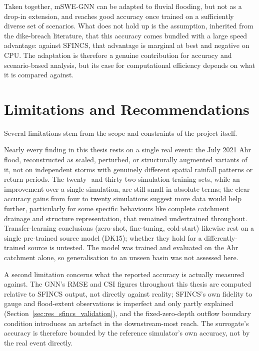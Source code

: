 \documentclass[12pt,a4paper]{report}
\begin{document}
{Taken together, mSWE-GNN can be adapted to fluvial flooding, but not as a drop-in
extension, and reaches good accuracy once trained on a sufficiently diverse set of
scenarios. What does not hold up is the assumption, inherited from the dike-breach
literature, that this accuracy comes bundled with a large speed advantage: against
SFINCS, that advantage is marginal at best and negative on CPU. The adaptation is
therefore a genuine contribution for accuracy and scenario-based analysis, but its
case for computational efficiency depends on what it is compared against.
 
 
 
\section{Limitations and Recommendations}
\label{sec:limitations_future_work}
 
Several limitations stem from the scope and constraints of the project itself.
 
Nearly every finding in this thesis rests on a single real event: the July 2021 Ahr flood, reconstructed as scaled, perturbed, or structurally augmented variants of it, not on independent storms with genuinely different spatial rainfall patterns or return periods. The twenty- and thirty-two-simulation training sets, while an improvement over a single simulation, are still small in absolute terms; the clear accuracy gains from four to twenty simulations suggest more data would help further, particularly for some specific behaviours like complete catchment drainage and structure representation, that remained undertrained throughout. Transfer-learning conclusions (zero-shot, fine-tuning, cold-start) likewise rest on a single pre-trained source model (DK15); whether they hold for a differently-trained source is untested. The model was trained and evaluated on the Ahr catchment alone, so generalisation to an unseen basin was not assessed here.
 
A second limitation concerns what the reported accuracy is actually measured against. The GNN's RMSE and CSI figures throughout this thesis are computed relative to SFINCS output, not directly against reality; SFINCS's own fidelity to gauge and flood-extent observations is imperfect and only partly explained (Section~\ref{sec:res_sfincs_validation}), and the fixed-zero-depth outflow boundary condition introduces an artefact in the downstream-most reach. The surrogate's accuracy is therefore bounded by the reference simulator's own accuracy, not by the real event directly.
 
}
\end{document}
